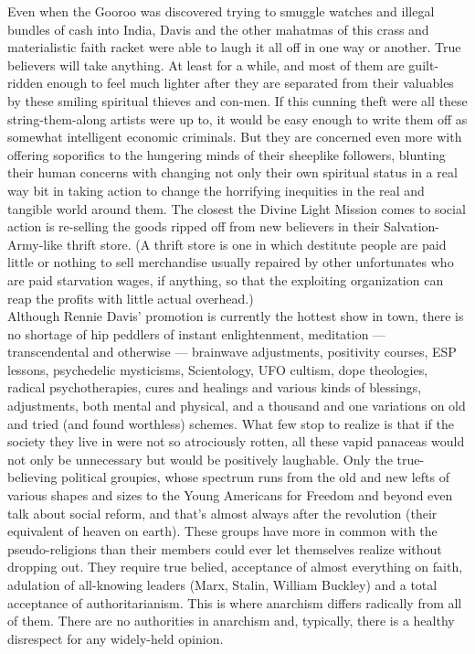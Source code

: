 \documentclass[12pt, onecolumn, letterpaper, oneside]{book}
\begin{document}
Even when the Gooroo was discovered trying to smuggle watches and illegal bundles of cash into India, Davis and the other mahatmas of this crass and materialistic faith racket were able to laugh it all off in one way or another. True believers will take anything. At least for a while, and most of them are guilt-ridden enough to feel much lighter after they are separated from their valuables by these smiling spiritual thieves and con-men. If this cunning theft were all these string-them-along artists were up to, it would be easy enough to write them off as somewhat intelligent economic criminals. But they are concerned even more with offering soporifics to the hungering minds of their sheeplike followers, blunting their human concerns with changing not only their own spiritual status in a real way bit in taking action to change the horrifying inequities in the real and tangible world around them. The closest the Divine Light Mission comes to social action is re-selling the goods ripped off from new believers in their Salvation-Army-like thrift store. (A thrift store is one in which destitute people are paid little or nothing to sell merchandise usually repaired by other unfortunates who are paid starvation wages, if anything, so that the exploiting organization can reap the profits with little actual overhead.)\\
Although Rennie Davis' promotion is currently the hottest show in town, there is no shortage of hip peddlers of instant enlightenment, meditation --- transcendental and otherwise --- brainwave adjustments, positivity courses, ESP lessons, psychedelic mysticisms, Scientology, UFO cultism, dope theologies, radical psychotherapies, cures and healings and various kinds of blessings, adjustments, both mental and physical, and a thousand and one variations on old and tried (and found worthless) schemes. What few stop to realize is that if the society they live in were not so atrociously rotten, all these vapid panaceas would not only be unnecessary but would be positively laughable. Only the true-believing political groupies, whose spectrum runs from the old and new lefts of various shapes and sizes to the Young Americans for Freedom and beyond even talk about social reform, and that's almost always after the revolution (their equivalent of heaven on earth). These groups have more in common with the pseudo-religions than their members could ever let themselves realize without dropping out. They require true belied, acceptance of almost everything on faith, adulation of all-knowing leaders (Marx, Stalin, William Buckley) and a total acceptance of authoritarianism. This is where anarchism differs radically from all of them. There are no authorities in anarchism and, typically, there is a healthy disrespect for any widely-held opinion.\\
\end{document}

